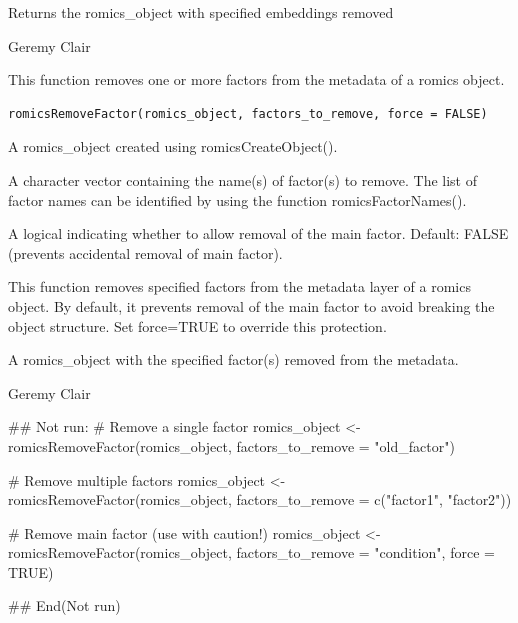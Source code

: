 \documentclass[a4paper]{book}
\begin{document}
%
\begin{Value}
Returns the romics\_object with specified embeddings removed
\end{Value}
%
\begin{Author}
Geremy Clair
\end{Author}
%
\begin{Description}
This function removes one or more factors from the metadata of a romics object.
\end{Description}
%
\begin{Usage}
\begin{verbatim}
romicsRemoveFactor(romics_object, factors_to_remove, force = FALSE)
\end{verbatim}
\end{Usage}
%
\begin{Arguments}
\begin{ldescription}
\item[\code{romics\_object}] A romics\_object created using romicsCreateObject().

\item[\code{factors\_to\_remove}] A character vector containing the name(s) of factor(s) to remove. The list of factor names can be identified by using the function romicsFactorNames().

\item[\code{force}] A logical indicating whether to allow removal of the main factor. Default: FALSE (prevents accidental removal of main factor).
\end{ldescription}
\end{Arguments}
%
\begin{Details}
This function removes specified factors from the metadata layer of a romics object. By default, it prevents removal of the main factor to avoid breaking the object structure. Set force=TRUE to override this protection.
\end{Details}
%
\begin{Value}
A romics\_object with the specified factor(s) removed from the metadata.
\end{Value}
%
\begin{Author}
Geremy Clair
\end{Author}
%
\begin{Examples}
\begin{ExampleCode}
## Not run: 
# Remove a single factor
romics_object <- romicsRemoveFactor(romics_object, factors_to_remove = "old_factor")

# Remove multiple factors
romics_object <- romicsRemoveFactor(romics_object, factors_to_remove = c("factor1", "factor2"))

# Remove main factor (use with caution!)
romics_object <- romicsRemoveFactor(romics_object, factors_to_remove = "condition", force = TRUE)

## End(Not run)
\end{ExampleCode}
\end{Examples}
\end{document}

